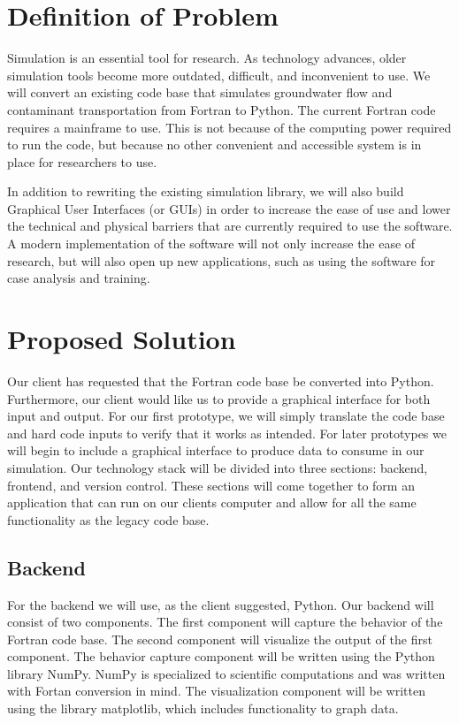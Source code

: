 \documentclass[10pt, draftclsnofoot, onecolumn]{IEEEtran}
\begin{document}

\tableofcontents

\section{Definition of Problem}

Simulation is an essential tool for research. As technology advances, older simulation tools become more outdated, difficult, and inconvenient to use. We will convert an existing code base that simulates groundwater flow and contaminant transportation from Fortran to Python. The current Fortran code requires a mainframe to use. This is not because of the computing power required to run the code, but because no other convenient and accessible system is in place for researchers to use.

In addition to rewriting the existing simulation library, we will also build Graphical User Interfaces (or GUIs) in order to increase the ease of use and lower the technical and physical barriers that are currently required to use the software. A modern implementation of the software will not only increase the ease of research, but will also open up new applications, such as using the software for case analysis and training.

\section{Proposed Solution}

Our client has requested that the Fortran code base be converted into Python. Furthermore, our client would like us to provide a graphical interface for both input and output. For our first prototype, we will simply translate the code base and hard code inputs to verify that it works as intended. For later prototypes we will begin to include a graphical interface to produce data to consume in our simulation. Our technology stack will be divided into three sections: backend, frontend, and version control. These sections will come together to form an application that can run on our clients computer and allow for all the same functionality as the legacy code base.


\subsection{Backend}

For the backend we will use, as the client suggested, Python. Our backend will consist of two components. The first component will capture the behavior of the Fortran code base. The second component will visualize the output of the first component. The behavior capture component will be written using the Python library NumPy. NumPy is specialized to scientific computations and was written with Fortan conversion in mind. The visualization component will be written using the library matplotlib, which includes functionality to graph data.
\end{document}
